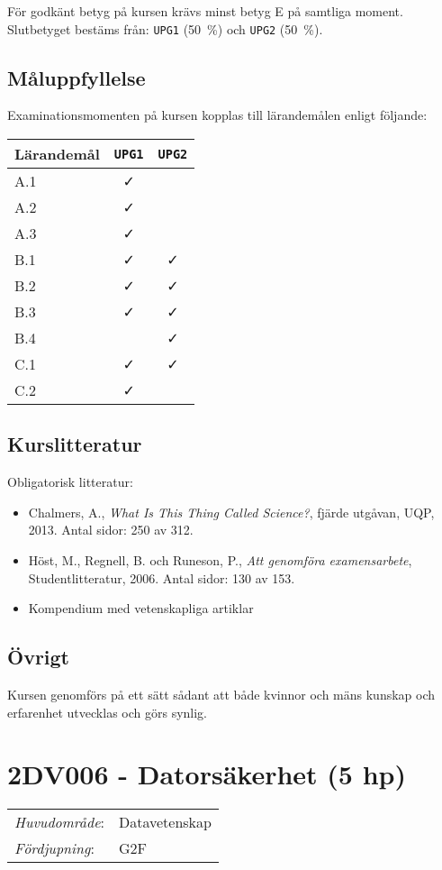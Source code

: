 För godkänt betyg på kursen krävs minst betyg E på samtliga moment.
Slutbetyget bestäms från: \texttt{UPG1} (50~\%) och \texttt{UPG2} (50~\%).

\subsection*{Måluppfyllelse}

Examinationsmomenten på kursen kopplas till lärandemålen enligt
följande:

\begin{longtable}[]{@{}lcc@{}}
\toprule
\textsf{Lärandemål} & \texttt{UPG1} & \texttt{UPG2}\tabularnewline
\midrule
\endhead
A.1 & \faCheck &\tabularnewline
A.2 & \faCheck &\tabularnewline
A.3 & \faCheck &\tabularnewline
B.1 & \faCheck & \faCheck\tabularnewline
B.2 & \faCheck & \faCheck\tabularnewline
B.3 & \faCheck & \faCheck\tabularnewline
B.4 & & \faCheck\tabularnewline
C.1 & \faCheck & \faCheck\tabularnewline
C.2 & \faCheck &\tabularnewline
\bottomrule
\end{longtable}

\subsection*{Kurslitteratur}

Obligatorisk litteratur:

\begin{itemize}
\tightlist
\item
  Chalmers, A., \emph{What Is This Thing Called Science?}, fjärde
  utgåvan, UQP, 2013. Antal sidor: 250 av 312.
\item
  Höst, M., Regnell, B. och Runeson, P., \emph{Att genomföra
  examensarbete}, Studentlitteratur, 2006. Antal sidor: 130 av 153.
\item
  Kompendium med vetenskapliga artiklar
\end{itemize}

\subsection*{Övrigt}

Kursen genomförs på ett sätt sådant att både kvinnor och mäns kunskap och erfarenhet utvecklas och görs synlig.
\pagebreak
\section*{2DV006 - Datorsäkerhet (5 hp)}

\begin{tabular}{ll}\emph{Huvudområde}: & Datavetenskap\tabularnewline\emph{Fördjupning}: & G2F\tabularnewline\end{tabular}

